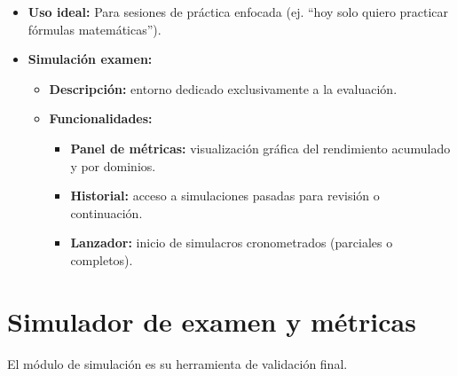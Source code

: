 \begin{itemize}
\begin{itemize}
\begin{itemize}
\item \textbf{\faChild Explícamelo como a un niño:} utiliza analogías cotidianas (ej. legos, cocina) para explicar temas densos. \textbf{Ejemplo (\gls{evm}):} \textit{\enquote{imagina que construyes una casa de Lego. Tenías que poner 10 ladrillos hoy (valor planificado), pero solo pusiste 8...}}
\item \textbf{\faCalculator Entrenador de fórmulas:} módulo especializado para dominar el \gls{evm} y la ruta crítica. Practique ejercicios numéricos y aprenda a interpretar los resultados.
\end{itemize}
\item \textbf{Uso ideal:} Para sesiones de práctica enfocada (ej. \enquote{hoy solo quiero practicar fórmulas matemáticas}).
\end{itemize}
\end{itemize}
\begin{itemize}
\item \textbf{\faGraduationCap Simulación examen:}
\begin{itemize}
\item \textbf{Descripción:} entorno dedicado exclusivamente a la evaluación.
\item \textbf{Funcionalidades:}
\begin{itemize}
\item \textbf{Panel de métricas:} visualización gráfica del rendimiento acumulado y por dominios.
\item \textbf{Historial:} acceso a simulaciones pasadas para revisión o continuación.
\item \textbf{Lanzador:} inicio de simulacros cronometrados (parciales o completos).
\end{itemize}
\end{itemize}
\end{itemize}
\section{Simulador de examen y métricas}

El módulo de simulación es su herramienta de validación final.

